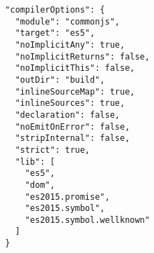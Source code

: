 \begin{verbatim}
  "compilerOptions": {
    "module": "commonjs",
    "target": "es5",
    "noImplicitAny": true,
    "noImplicitReturns": false,
    "noImplicitThis": false,
    "outDir": "build",
    "inlineSourceMap": true,
    "inlineSources": true,
    "declaration": false,
    "noEmitOnError": false,
    "stripInternal": false,
    "strict": true,
    "lib": [
      "es5",
      "dom",
      "es2015.promise",
      "es2015.symbol",
      "es2015.symbol.wellknown"
    ]
  }
\end{verbatim}
